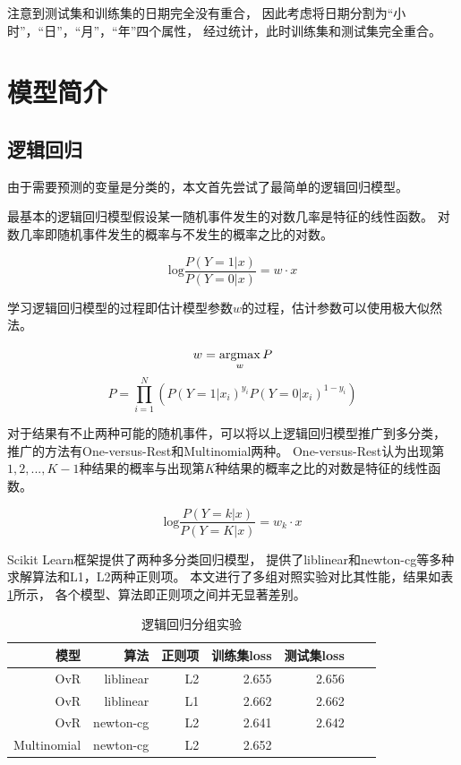 \documentclass[a4paper, twocolumn]{article}
\begin{document}
注意到测试集和训练集的日期完全没有重合，
因此考虑将日期分割为“小时”，“日”，“月”，“年”四个属性，
经过统计，此时训练集和测试集完全重合。

\section{模型简介}

\subsection{逻辑回归}

由于需要预测的变量是分类的，本文首先尝试了最简单的逻辑回归模型。

最基本的逻辑回归模型假设某一随机事件发生的对数几率是特征的线性函数。
对数几率即随机事件发生的概率与不发生的概率之比的对数。

\begin{equation}
    \mathrm{log}\frac{P(Y=1|x)}{P(Y=0|x)}=w\cdot x
\end{equation}

学习逻辑回归模型的过程即估计模型参数$w$的过程，估计参数可以使用极大似然法。

\begin{equation}
    w=\operatornamewithlimits{argmax}_wP
\end{equation}
\begin{equation}
    P=\prod_{i=1}^N \left( P(Y=1|x_i)^{y_i} P(Y=0|x_i)^{1-y_i} \right)
\end{equation}

对于结果有不止两种可能的随机事件，可以将以上逻辑回归模型推广到多分类，
推广的方法有One-versus-Rest和Multinomial两种。
One-versus-Rest认为出现第$1,2,...,K-1$种结果的概率与出现第$K$种结果的概率之比的对数是特征的线性函数。

\begin{equation}
    \mathrm{log}\frac{P(Y=k|x)}{P(Y=K|x)}=w_k\cdot x
\end{equation}

Scikit Learn框架提供了两种多分类回归模型，
提供了liblinear和newton-cg等多种求解算法和L1，L2两种正则项。
本文进行了多组对照实验对比其性能，结果如表\ref{tab:logsitic}所示，
各个模型、算法即正则项之间并无显著差别。

\begin{table}[h]
    \centering
    \begin{tabular}{*{7}{r}}
        \hline
        模型& 算法& 正则项& 训练集loss& 测试集loss \\
        \hline
        OvR& liblinear& L2& 2.655& 2.656& \\
        OvR& liblinear& L1& 2.662& 2.662& \\
        OvR& newton-cg& L2& 2.641& 2.642& \\
        Multinomial& newton-cg& L2& 2.652& & \\
        \hline
    \end{tabular}
    \caption{逻辑回归分组实验}
    \label{tab:logsitic}
\end{table}
\end{document}
